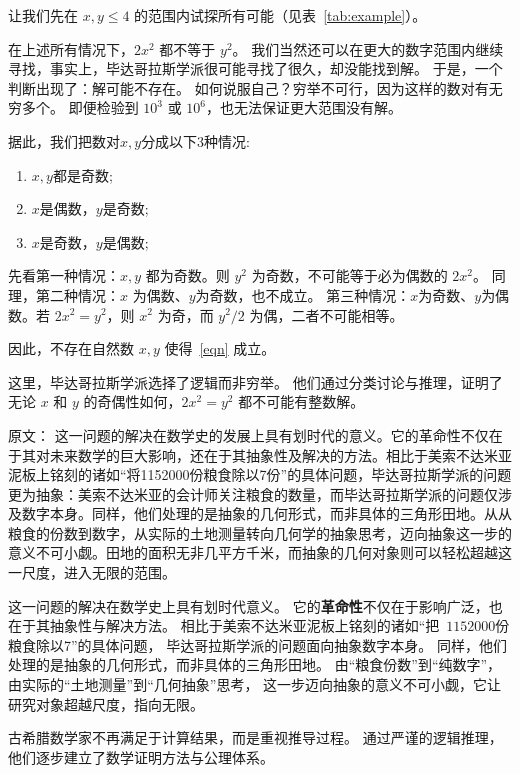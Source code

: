 让我们先在 $x,y\le 4$ 的范围内试探所有可能（见表~\ref{tab:example}）。


在上述所有情况下，$2x^2$ 都不等于 $y^2$。  
我们当然还可以在更大的数字范围内继续寻找，事实上，毕达哥拉斯学派很可能寻找了很久，却没能找到解。
于是，一个判断出现了：解可能不存在。  
如何说服自己？穷举不可行，因为这样的数对有无穷多个。  
即便检验到 $10^3$ 或 $10^6$，也无法保证更大范围没有解。

据此，我们把数对$x,y$分成以下3种情况:
\begin{enumerate}
\item $x,y$都是奇数;
\item $x$是偶数，$y$是奇数;
\item $x$是奇数，$y$是偶数;

\end{enumerate}


先看第一种情况：$x,y$ 都为奇数。则 $y^2$ 为奇数，不可能等于必为偶数的 $2x^2$。  
同理，第二种情况：$x$ 为偶数、$y$为奇数，也不成立。  
第三种情况：$x$为奇数、$y$为偶数。若 $2x^2=y^2$，则 $x^2$ 为奇，而 $y^2/2$ 为偶，二者不可能相等。


因此，不存在自然数 $x,y$ 使得~\eqref{eqn} 成立。


这里，毕达哥拉斯学派选择了逻辑而非穷举。  
他们通过分类讨论与推理，证明了无论 $x$ 和 $y$ 的奇偶性如何，$2x^2=y^2$ 都不可能有整数解。

原文：
这一问题的解决在数学史的发展上具有划时代的意义。它的革命性不仅在于其对未来数学的巨大影响，还在于其抽象性及解决的方法。相比于美索不达米亚泥板上铭刻的诸如“将1152000份粮食除以7份”的具体问题，毕达哥拉斯学派的问题更为抽象：美索不达米亚的会计师关注粮食的数量，而毕达哥拉斯学派的问题仅涉及数字本身。同样，他们处理的是抽象的几何形式，而非具体的三角形田地。从从粮食的份数到数字，从实际的土地测量转向几何学的抽象思考，迈向抽象这一步的意义不可小觑。田地的面积无非几平方千米，而抽象的几何对象则可以轻松超越这一尺度，进入无限的范围。



这一问题的解决在数学史上具有划时代意义。  
它的{\bf 革命性}不仅在于影响广泛，也在于其抽象性与解决方法。  
相比于美索不达米亚泥板上铭刻的诸如“把~$1152000$份粮食除以7”的具体问题，  
毕达哥拉斯学派的问题面向抽象数字本身。  
同样，他们处理的是抽象的几何形式，而非具体的三角形田地。
由“粮食份数”到“纯数字”，由实际的“土地测量”到“几何抽象”思考，  
这一步迈向抽象的意义不可小觑，它让研究对象超越尺度，指向无限。


古希腊数学家不再满足于计算结果，而是重视推导过程。  
通过严谨的逻辑推理，他们逐步建立了数学证明方法与公理体系。


